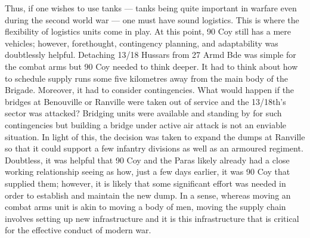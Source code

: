 \documentclass[noraggedright]{turabian-researchpaper}
\begin{document}
Thus, if one wishes to use tanks --- tanks being quite important in warfare
even during the second world war --- one must have sound logistics.  This is
where the flexibility of logistics units come in play.  At this point, 90 Coy
still has a mere %
vehicles; however, forethought, contingency planning, and adaptability was
doubtlessly helpful.  Detaching 13/18 Hussars from 27 Armd Bde was simple for
the combat arms but 90 Coy needed to think deeper.  It had to think about how
to schedule supply runs some five kilometres away from the main body of the 
Brigade.  Moreover, it had to consider contingencies.  What would happen if
the bridges at Benouville or Ranville were taken out of service and the 
13/18th's sector was attacked?  Bridging units were available and standing by
for such contingencies but building a bridge under active air attack is not
an enviable situation.  In light of this, the decision was taken to expand the
dumps at Ranville so that it could support a few infantry divisions as well as
an armoured regiment. Doubtless, it was helpful that 90 Coy and the Paras 
likely already had a close working relationship seeing as how, just a few
days earlier, it was 90 Coy that supplied them; however, it is likely that
some significant effort was needed in order to establish and maintain the
new dump.  In a sense, whereas moving an combat arms unit is akin to moving
a body of men, moving the supply chain involves setting up new infrastructure
and it is this infrastructure that is critical for the effective conduct of 
modern war.


\end{document}
